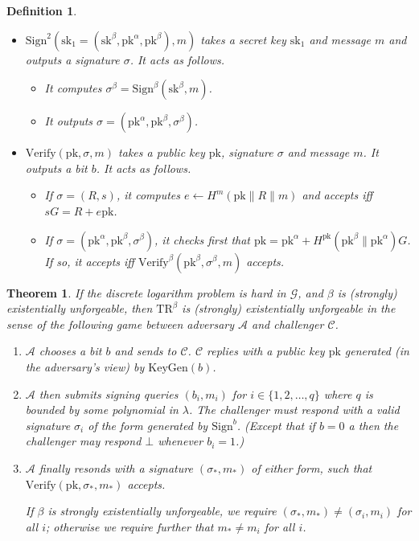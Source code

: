 \documentclass[letterpaper]{article}
\newtheorem{thrm}{Theorem}
\newtheorem{defn}{Definition}
\newcommand{\TR}[1]{\mathrm{TR}^{#1}}
\newcommand{\KeyGen}{\mathrm{KeyGen}}
\newcommand{\Sign}{\mathrm{Sign}}
\newcommand{\Verify}{\mathrm{Verify}}
\newcommand{\sk}{\mathrm{sk}}
\newcommand{\pk}{\mathrm{pk}}
\begin{document}
\begin{defn}
\begin{itemize}
\item $\Sign^2(\sk_1 = (\sk^\beta, \pk^\alpha, \pk^\beta), m)$ takes a secret key $\sk_1$ and
message $m$ and outputs a signature $\sigma$. It acts as follows.
\begin{itemize}
\item It computes $\sigma^\beta = \Sign^\beta(\sk^\beta, m)$.
\item It outputs $\sigma = (\pk^\alpha, \pk^\beta, \sigma^\beta)$.
\end{itemize}


\item $\Verify(\pk, \sigma, m)$ takes a public key $\pk$, signature $\sigma$ and
message $m$. It outputs a bit $b$. It acts as follows.

\begin{itemize}
\item If $\sigma = (R, s)$, it computes $e\gets H^m(\pk\|R\|m)$ and accepts
iff $sG = R + e\pk$.

\item If $\sigma = (\pk^\alpha, \pk^\beta, \sigma^\beta)$, it checks first that
$\pk = \pk^\alpha + H^\pk(\pk^\beta\|\pk^\alpha)G$. If so, it accepts iff
$\Verify^\beta(\pk^\beta, \sigma^\beta, m)$ accepts.
\end{itemize}

\end{itemize}

\end{defn}

\begin{thrm} If the discrete logarithm problem is hard in $\mathcal{G}$, and
$\beta$ is (strongly) existentially unforgeable, then $\TR\beta$ is (strongly)
existentially unforgeable in the sense of the following game between adversary
$\mathcal{A}$ and challenger $\mathcal{C}$.

\begin{enumerate}
\item $\mathcal{A}$ chooses a bit $b$ and sends to $\mathcal{C}$.
$\mathcal{C}$ replies with a public key $\pk$ generated (in the adversary's
view) by $\KeyGen(b)$.
\item $\mathcal{A}$ then submits signing queries $(b_i, m_i)$ for $i\in\{1,2,\ldots,q\}$
where $q$ is bounded by some polynomial in $\lambda$. The challenger must respond
with a valid signature $\sigma_i$ of the form generated by $\Sign^b$. (Except that
if $b=0$ a then the challenger may respond $\bot$ whenever $b_i=1$.)
\item $\mathcal{A}$ finally resonds with a signature $(\sigma_*, m_*)$ of either
form, such that $\Verify(\pk, \sigma_*, m_*)$ accepts.

If $\beta$ is strongly existentially unforgeable, we require $(\sigma_*, m_*)\neq
(\sigma_i, m_i)$ for all $i$; otherwise we require further that $m_*\neq m_i$ for
all $i$.
\end{enumerate}
\end{thrm}
\end{document}
